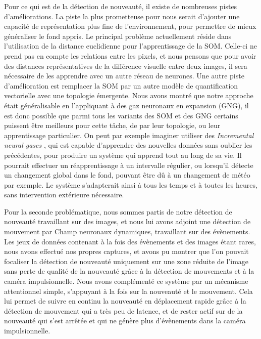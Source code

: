 Pour ce qui est de la détection de nouveauté, il existe de nombreuses pistes d'améliorations. La piste la plus prometteuse pour nous serait d'ajouter une capacité de représentation plus fine de l'environnement, pour permettre de mieux généraliser le fond appris. Le principal problème actuellement réside dans l'utilisation de la distance euclidienne pour l'apprentissage de la SOM. Celle-ci ne prend pas en compte les relations entre les pixels, et nous pensons que pour avoir des distances représentatives de la différence visuelle entre deux images, il sera nécessaire de les apprendre avec un autre réseau de neurones. Une autre piste d'amélioration est remplacer la SOM par un autre modèle de quantification vectorielle avec une topologie émergente. Nous avons montré que notre approche était généralisable en l'appliquant à des gaz neuronaux en expansion (GNG), il est donc possible que parmi tous les variants des SOM et des GNG certains puissent être meilleurs pour cette tâche, de par leur topologie, ou leur apprentissage particulier. On peut par exemple imaginer utiliser des \textit{Incremental neural gases} \cite{prudent2005incremental}, qui est capable d'apprendre des nouvelles données sans oublier les précédentes, pour produire un système qui apprend tout au long de sa vie. Il pourrait effectuer un réapprentissage à un intervalle régulier, ou lorsqu'il détecte un changement global dans le fond, pouvant être dû à un changement de météo par exemple. Le système s'adapterait ainsi à tous les temps et à toutes les heures, sans intervention extérieure nécessaire.

Pour la seconde problématique, nous sommes partis de notre détection de nouveauté travaillant sur des images, et nous lui avons adjoint une détection de mouvement par Champ neuronaux dynamiques, travaillant sur des évènements. Les jeux de données contenant à la fois des évènements et des images étant rares, nous avons effectué nos propres captures, et avons pu montrer que l'on pouvait focaliser la détection de nouveauté uniquement sur une zone réduite de l'image sans perte de qualité de la nouveauté grâce à la détection de mouvements et à la caméra impulsionnelle. Nous avons complémenté ce système par un mécanisme attentionnel simple, s'appuyant à la fois sur la nouveauté et le mouvement. Cela lui permet de suivre en continu la nouveauté en déplacement rapide grâce à la détection de mouvement qui a très peu de latence, et de rester actif sur de la nouveauté qui s'est arrêtée et qui ne génère plus d'évènements dans la caméra impulsionnelle.

